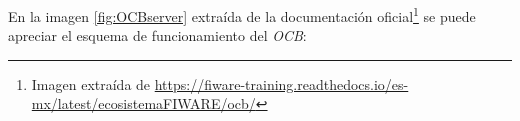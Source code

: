 En la imagen \ref{fig:OCBserver} extraída de la documentación oficial\footnote{Imagen extraída de \url{https://fiware-training.readthedocs.io/es-mx/latest/ecosistemaFIWARE/ocb/}} se puede apreciar el esquema de funcionamiento del \textit{OCB}:


\begin{comment}
En aquellos proyectos que necesiten para su comprensión y desarrollo de unos conceptos teóricos de una determinada materia o de un determinado dominio de conocimiento, debe existir un apartado que sintetice dichos conceptos.

Algunos conceptos teóricos de \LaTeX{} \footnote{Créditos a los proyectos de Álvaro López Cantero: Configurador de Presupuestos y Roberto Izquierdo Amo: PLQuiz}.


Las secciones se incluyen con el comando section.

\subsection{Subsecciones}

Además de secciones tenemos subsecciones.

\subsubsection{Subsubsecciones}

Y subsecciones. 


\section{Referencias}

Las referencias se incluyen en el texto usando cite~\cite{wiki:latex}. Para citar webs, artículos o libros~\cite{koza92}, si se desean citar más de uno en el mismo lugar~\cite{bortolot2005, koza92}.


\section{Imágenes}

Se pueden incluir imágenes con los comandos standard de \LaTeX, pero esta plantilla dispone de comandos propios como por ejemplo el siguiente:


\end{comment}
